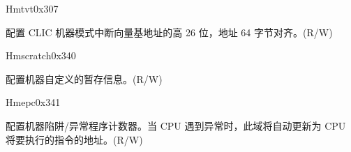 \begin{register}{H}{mtvt}{0x307}\label{regdesc:MTVT}
%
%
\regnewline%
\begin{regdesc}\begin{reglist}
\label{fielddesc:MTVTBASE}\item [BASE] 配置 CLIC 机器模式中断向量基地址的高 26 位，地址 64 字节对齐。(R/W)
\end{reglist}\end{regdesc}
\end{register}

\begin{register}{H}{mscratch}{0x340}\label{regdesc:MSCRATCH}
%
\regnewline%
\begin{regdesc}\begin{reglist}
\label{fielddesc:MSCRATCH}\item [MSCRATCH] 配置机器自定义的暂存信息。(R/W)
\end{reglist}\end{regdesc}
\end{register}

\begin{register}{H}{mepc}{0x341}\label{regdesc:MEPC}
%
\regnewline%
\begin{regdesc}\begin{reglist}
\label{fielddesc:MEPC}\item [MEPC] 配置机器陷阱/异常程序计数器。当 CPU 遇到异常时，此域将自动更新为 CPU 将要执行的指令的地址。(R/W)
\end{reglist}\end{regdesc}
\end{register}

